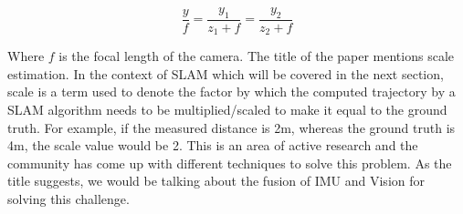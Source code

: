 \begin{equation}
\frac{y}{f}=\frac{y_1}{z_1+f}=\frac{y_2}{z_2+f}
\end{equation}

Where $f$ is the focal length of the camera. The title of the paper mentions scale estimation. In the context of SLAM which will be covered in the next section, scale is a term used to denote the factor by which the computed trajectory by a SLAM algorithm needs to be multiplied/scaled to make it equal to the ground truth. For example, if the measured distance is 2m, whereas the ground truth is 4m, the scale value would be 2. This is an area of active research and the community has come up with different techniques to solve this problem. As the title suggests, we would be talking about the fusion of IMU and Vision for solving this challenge.
